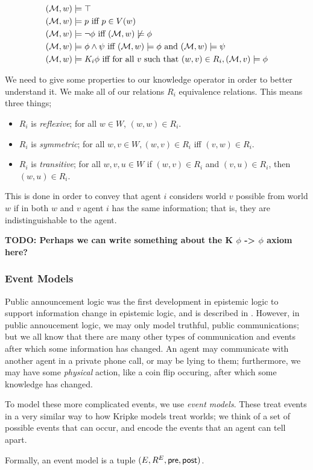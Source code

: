 \documentclass[12pt, a4paper]{article}
\begin{document}
\begin{align*}
  (\mathcal{M}, w) & \models \top \\
  (\mathcal{M}, w) & \models p \text{ iff } p \in V(w) \\
  (\mathcal{M}, w) & \models \neg \phi \text{ iff } (\mathcal{M}, w) \not \models \phi \\
  (\mathcal{M}, w) & \models \phi \land \psi \text{ iff } (\mathcal{M}, w) \models \phi \text{ and } (\mathcal{M}, w) \models \psi \\
  (\mathcal{M}, w) & \models K_i \phi \text{ iff for all $v$ such that } (w, v) \in R_i, (\mathcal{M}, v) \models \phi 
\end{align*}

\bigskip 

We need to give some properties to our knowledge operator in order to better
understand it. We make all of our relations $R_i$ equivalence relations. This
means three things;

\begin{itemize}
\item $R_i$ is \textit{reflexive}; for all $w \in W$, $(w, w) \in R_i$.
\item $R_i$ is \textit{symmetric}; for all $w, v \in W, (w, v) \in R_i$ iff $(v,
  w) \in R_i$.
\item $R_i$ is \textit{transitive}; for all $w, v, u \in W$ if $(w, v) \in R_i$
  and $(v, u) \in R_i$, then $(w, u) \in R_i$.
\end{itemize}

This is done in order to convey that agent $i$ considers world $v$ possible from
world $w$ if in both $w$ and $v$ agent $i$ has the same information; that is,
they are indistinguishable to the agent.

\textbf{TODO: Perhaps we can write something about the K $\phi$ -> $\phi$ axiom here?} 

\subsubsection{Event Models}

Public announcement logic was the first development in epistemic logic to
support information change in epistemic logic, and is described in \cite{PAL}.
However, in public annoucement logic, we may only model truthful, public
communications; but we all know that there are many other types of communication
and events after which some information has changed. An agent may communicate
with another agent in a private phone call, or may be lying to them;
furthermore, we may have some \textit{physical} action, like a coin flip
occuring, after which some knowledge has changed.

To model these more complicated events, we use \textit{event models}. These
treat events in a very similar way to how Kripke models treat worlds; we think
of a set of possible events that can occur, and encode the events that an agent
can tell apart.

Formally, an event model is a tuple $(E, R^E, \textsf{pre}, \textsf{post})$. 




\printbibliography[title={Bibliography}]
\end{document}
